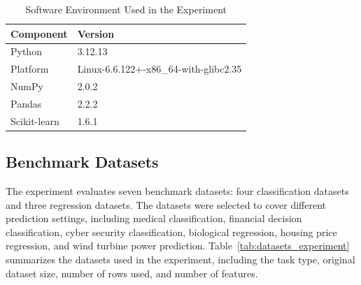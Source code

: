 \begin{table}[H]
    \centering
    \caption{Software Environment Used in the Experiment}
    \label{tab:software_environment_used_in_the_experiment}
    \small
    \begin{tabular}{ll}
        \toprule
        \textbf{Component} & \textbf{Version}                      \\
        \midrule
        Python             & 3.12.13                               \\
        Platform           & Linux-6.6.122+-x86\_64-with-glibc2.35 \\
        NumPy              & 2.0.2                                 \\
        Pandas             & 2.2.2                                 \\
        Scikit-learn       & 1.6.1                                 \\
        \bottomrule
    \end{tabular}
\end{table}

\subsection{Benchmark Datasets}

\hs The experiment evaluates seven benchmark datasets: four classification datasets and three regression datasets. The datasets were selected to cover different prediction settings, including medical classification, financial decision classification, cyber security classification, biological regression, housing price regression, and wind turbine power prediction. Table~\ref{tab:datasets_experiment} summarizes the datasets used in the experiment, including the task type, original dataset size, number of rows used, and number of features.

